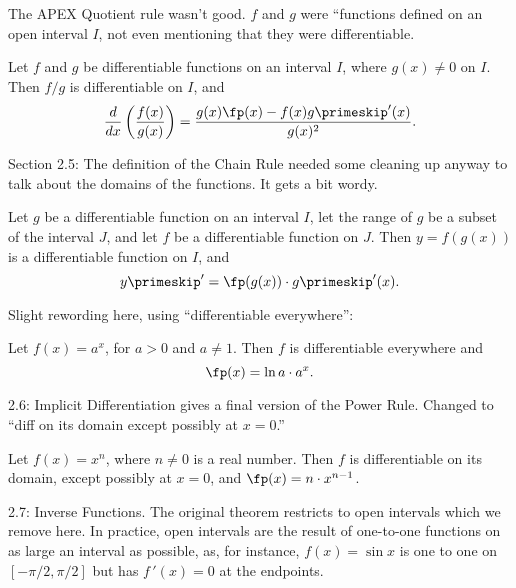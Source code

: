 \documentclass{article}
\begin{document}
The APEX Quotient rule wasn't good. $f$ and $g$ were ``functions defined on an open interval $I$, not even mentioning that they were differentiable.

{Let $f$ and $g$ be differentiable functions on an interval $I$, where $g(x) \neq 0$ on $I$. Then $f/g$ is differentiable on $I$, and $$\frac{d}{dx}\left(\frac{f(x)}{g(x)}\right) = \frac{g(x)\fp(x) - f(x)g\primeskip'(x)}{g(x)^2}.$$
}

Section 2.5: The definition of the Chain Rule needed some cleaning up anyway to talk about the domains of the functions. It gets a bit wordy.

{Let $g$ be a differentiable function on an interval $I$, let the range of $g$ be a subset of the interval $J$, and let $f$ be a differentiable function on $J$.
 Then $y=f(g(x))$ is a differentiable function on $I$, and $$y\primeskip' = \fp(g(x))\cdot g\primeskip'(x).$$
}


Slight rewording here, using ``differentiable everywhere'':

{Let $f(x)=a^x$, for $a>0$ and $a\neq 1$. Then $f$ is differentiable everywhere and $$\fp(x) = \ln a\cdot a^x.$$
}

2.6: Implicit Differentiation gives a final version of the Power Rule. Changed to ``diff on its domain except possibly at $x=0$.''

{Let $f(x) = x^n$, where $n\neq 0$ is a real number. Then $f$ is differentiable on its domain, except possibly at $x=0$, and $\fp(x) = n\cdot x^{n-1}$.
}



2.7: Inverse Functions. The original theorem restricts to open intervals which we remove here. In practice, open intervals are the result of one-to-one functions on as large an interval as possible, as, for instance, $f(x) = \sin x$ is one to one on $[-\pi/2,\pi/2]$ but has $f\,'(x) = 0$ at the endpoints.
\end{document}

